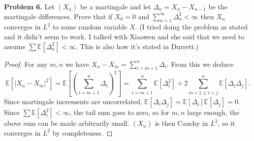 \documentclass[11pt,letterpaper]{report}
\newcommand{\E}{\mathbb{E}}
\begin{document}
\noindent\textbf{Problem 6. }
Let $(X_n)$ be a martingale and let $\Delta_n = X_n - X_{n-1}$ be the martingale differences. Prove that if $X_0=0$ and $\sum_{n=1}^\infty \Delta_n^2<\infty$ then $X_n$ converges in $L^2$ to some random variable $X$. (I tried doing the problem as stated and it didn't seem to work. I talked with Xiaowen and she said that we need to assume $\sum \E[\Delta_n^2]<\infty$. This is also how it's stated in Durrett.)
\begin{proof}
 	For any $m, n$ we have $X_n-X_m = \sum_{i=m+1}^n \Delta_i$. From this we deduce
 	\[
 	\E[|X_n - X_m|^2] = \E\left[\left(\sum_{i=m+1}^n\Delta_i\right)^2\right] = \sum_{i=m+1}^n\E[\Delta_i^2] + 2\sum_{m+1\leq i<j}^n\E[\Delta_i\Delta_j].
 	\]
 	Since martingale increments are uncorrelated, $\E[\Delta_i\Delta_j] = \E[\Delta_i]\E[\Delta_j] = 0$. Since $\sum \E[\Delta_i^2]<\infty$, the tail sum goes to zero, so for $m,n$ large enough, the above sum can be made arbitrarily small. $(X_n)$ is then Cauchy in $L^2$, so it converges in $L^2$ by completeness.
\end{proof} 
\end{document}
